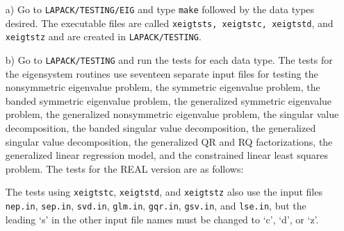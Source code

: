 \begin{itemize}

\item[a)]
Go to {\tt LAPACK/TESTING/EIG} and type {\tt make} followed by the data types
desired.  The executable files are called {\tt xeigtsts,
xeigtstc, xeigtstd}, and {\tt xeigtstz} and are created
in {\tt LAPACK/TESTING}.

\item[b)]
Go to {\tt LAPACK/TESTING} and run the tests for each data type.
The tests for the eigensystem routines use seventeen separate input files
for testing the nonsymmetric eigenvalue problem,
the symmetric eigenvalue problem, the banded symmetric eigenvalue
problem, the generalized symmetric eigenvalue
problem, the generalized nonsymmetric eigenvalue problem, the 
singular value decomposition, the banded singular value decomposition,
the generalized singular value
decomposition, the generalized QR and RQ factorizations, the generalized
linear regression model, and the constrained linear least squares
problem.
The tests for the REAL version are as follows:
The tests using {\tt xeigtstc}, {\tt xeigtstd}, and {\tt xeigtstz} also
use the input files {\tt nep.in}, {\tt sep.in}, {\tt svd.in},
{\tt glm.in}, {\tt gqr.in}, {\tt gsv.in}, and {\tt lse.in},
but the leading `s' in the other input file names must be changed
to `c', `d', or `z'.
\end{itemize}

